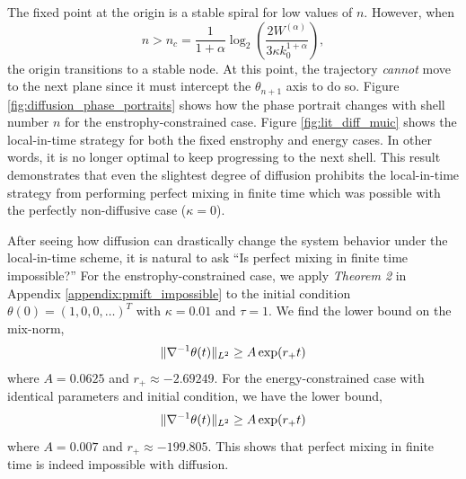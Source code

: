 The fixed point at the origin is a stable spiral for low values of $n$. However, when
\begin{equation}
\label{eq:critical_n}
	n > n_{c} = \frac{1}{1+\alpha}\log_{2}\left(\frac{2 W^{(\alpha)}}{3 \kappa k _{0}^{1+\alpha}}\right),
\end{equation}
the origin transitions to a stable node. At this point, the trajectory {\it cannot } move to the next plane since it must intercept the $\theta_{n+1}$ axis to do so. Figure \ref{fig:diffusion_phase_portraits} shows how the phase portrait changes with shell number $n$ for the enstrophy-constrained case. Figure \ref{fig:lit_diff_muic} shows the local-in-time strategy for both the fixed enstrophy and energy cases. In other words, it is no longer optimal to keep progressing to the next shell.  This result demonstrates that even the slightest degree of diffusion prohibits the local-in-time strategy from performing perfect mixing in finite time which was possible with the perfectly non-diffusive case ($\kappa=0$).

After seeing how diffusion can drastically change the system behavior under the local-in-time scheme, it is natural to ask ``Is perfect mixing in finite time impossible?'' For the enstrophy-constrained case, we apply {\it Theorem 2} in Appendix \ref{appendix:pmift_impossible} to the initial condition $\theta(0)=(1, 0, 0 , \dots )^{T}$ with $\kappa=0.01$ and $\tau=1$. We find the lower bound on the mix-norm,
\begin{equation}
\|\nabla^{-1} \theta(t)\|_{L^{2}}\geq A\exp(r_{+}t) 
\end{equation}
where $A =   0.0625$ and $r_{+}\approx -2.69249$. For the energy-constrained case with identical parameters and initial condition, we have the lower bound,
\begin{equation}
\|\nabla^{-1} \theta(t)\|_{L^{2}}\geq A\exp(r_{+}t) 
\end{equation}
where $A =   0.007$ and $r_{+}\approx -199.805$. This shows that perfect mixing in finite time is indeed impossible with diffusion.


